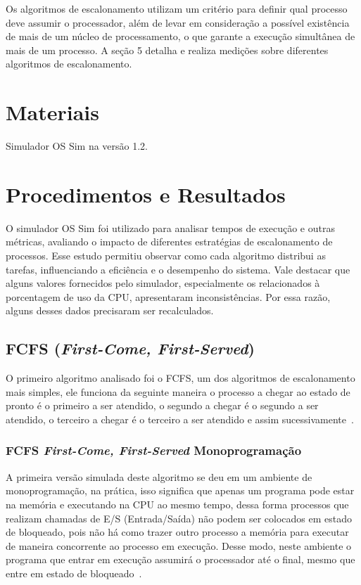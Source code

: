 \documentclass[
	12pt,				%
	oneside,   	        %
	a4paper,			%
	english,			%
	french,				%
	spanish,			%
	brazil,				%
	]{pacotes/abntex2}
\begin{document}
Os algoritmos de escalonamento utilizam um critério para definir qual processo deve assumir o processador, além de levar em consideração a possível existência de mais de um núcleo de processamento, o que garante a execução simultânea de mais de um processo. A seção 5 detalha e realiza medições sobre diferentes algoritmos de escalonamento.

\section{Materiais}
\label{sec:materiais}

Simulador OS Sim na versão 1.2.

\section{Procedimentos e Resultados}
\label{sec:procedimentos}

O simulador OS Sim foi utilizado para analisar tempos de execução e outras métricas, avaliando o impacto de diferentes estratégias de escalonamento de processos. Esse estudo permitiu observar como cada algoritmo distribui as tarefas, influenciando a eficiência e o desempenho do sistema. Vale destacar que alguns valores fornecidos pelo simulador, especialmente os relacionados à porcentagem de uso da CPU, apresentaram inconsistências. Por essa razão, alguns desses dados precisaram ser recalculados.

\subsection{FCFS (\textit{First-Come, First-Served})}
\label{subsec:fcfs}

O primeiro algoritmo analisado foi o FCFS, um dos algoritmos de escalonamento mais simples, ele funciona da seguinte maneira o processo a chegar ao estado de pronto é o primeiro a ser atendido, o segundo a chegar é o segundo a ser atendido, o terceiro a chegar é o terceiro a ser atendido e assim sucessivamente~\cite{maziero2019}. 

\subsubsection{FCFS \textit{First-Come, First-Served} Monoprogramação}
\label{subsubsec:mono_fcfs}

A primeira versão simulada deste algoritmo se deu em um ambiente de monoprogramação, na prática, isso significa que apenas um programa pode estar na memória e executando na CPU ao mesmo tempo, dessa forma processos que realizam chamadas de E/S (Entrada/Saída) não podem ser colocados em estado de bloqueado, pois não há como trazer outro processo a memória para executar de maneira concorrente ao processo em execução. Desse modo, neste ambiente o programa que entrar em execução assumirá o processador até o final, mesmo que entre em estado de bloqueado~\cite{tanenbaum2016}.
\end{document}
